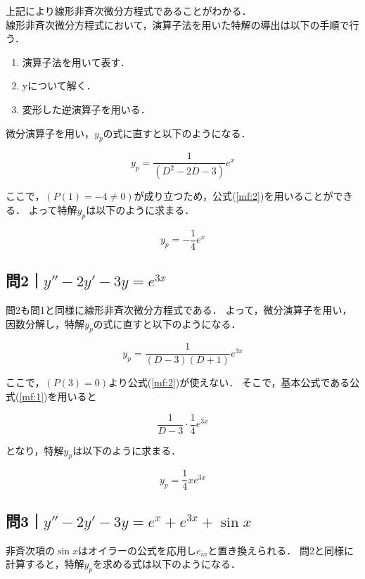 \documentclass[a4paper,11pt]{bxjsarticle}
\begin{document}
上記により線形非斉次微分方程式であることがわかる．\\
線形非斉次微分方程式において，演算子法を用いた特解の導出は以下の手順で行う．

\begin{enumerate}
  \item 演算子法を用いて表す．
  \item yについて解く．
  \item 変形した逆演算子を用いる．
\end{enumerate}

微分演算子を用い，$y_p$の式に直すと以下のようになる．

\begin{equation}
  y_p = \frac{1}{(D^2-2D-3)}e^x
\end{equation}

ここで，$(P(1)=-4\neq 0)$が成り立つため，公式(\ref{mf:2})を用いることができる．
よって特解$y_p$は以下のように求まる．

\begin{equation}
  y_p = -\frac{1}{4}e^{x}
\end{equation}

\subsection{問2｜$y''-2y'-3y=e^{3x}$}
問2も問1と同様に線形非斉次微分方程式である．
よって，微分演算子を用い，因数分解し，特解$y_p$の式に直すと以下のようになる．

\begin{equation}
  y_p = \frac{1}{(D-3)(D+1)}e^{3x}
\end{equation}

ここで，$(P(3)= 0)$より公式(\ref{mf:2})が使えない．
そこで，基本公式である公式(\ref{mf:1})を用いると

\begin{equation}
  \frac{1}{D-3}\cdot\frac{1}{4}e^{3x}
\end{equation}

となり，特解$y_p$は以下のように求まる．

\begin{equation}
  y_p=\frac{1}{4}xe^{3x}
\end{equation}

\subsection{問3｜$y''-2y'-3y=e^x+e^{3x}+\sin x$}
非斉次項の$\sin x$はオイラーの公式を応用し$e_{ix}$と置き換えられる．
問2と同様に計算すると，特解$y_p$を求める式は以下のようになる．
\end{document}
